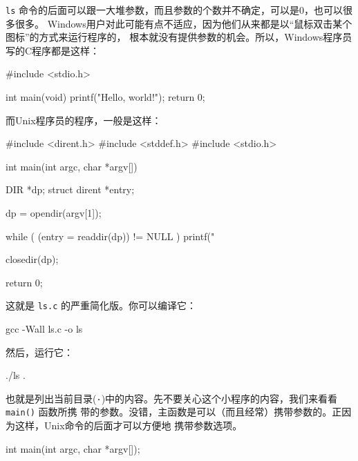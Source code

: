\documentclass{wx672ctexart}
\begin{document}
\texttt{ls} 命令的后面可以跟一大堆参数，而且参数的个数并不确定，可以是0，也可以很多很多。
Windows用户对此可能有点不适应，因为他们从来都是以“鼠标双击某个图标”的方式来运行程序的，
根本就没有提供参数的机会。所以，Windows程序员写的C程序都是这样：
\begin{ccode}
#include <stdio.h>

int main(void){
	printf("Hello, world!\n");
	return 0;
}
\end{ccode}
而Unix程序员的程序，一般是这样：
\begin{ccode}
#include <dirent.h>
#include <stddef.h>
#include <stdio.h>

int main(int argc, char *argv[])
{
	  DIR *dp;
	  struct dirent *entry;

	  dp = opendir(argv[1]);

	  while ( (entry = readdir(dp)) != NULL ){
		printf("%
	  }

	  closedir(dp);

	  return 0;
}
\end{ccode}
这就是 \texttt{ls.c} 的严重简化版。你可以编译它：
\begin{shellcode}
gcc -Wall ls.c -o ls
\end{shellcode}
然后，运行它：
\begin{shellcode}
./ls .
\end{shellcode}
也就是列出当前目录(\texttt{·})中的内容。先不要关心这个小程序的内容，我们来看看 \texttt{main()} 函数所携
带的参数。没错，主函数是可以（而且经常）携带参数的。正因为这样，Unix命令的后面才可以方便地
携带参数选项。
\begin{ccode}
int main(int argc, char *argv[]);
\end{ccode}
\end{document}
